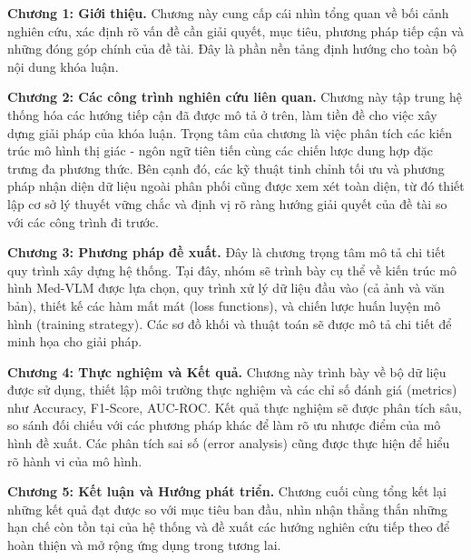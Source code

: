 \textbf{Chương 1: Giới thiệu.} Chương này cung cấp cái nhìn tổng quan về bối cảnh nghiên cứu, xác định rõ vấn đề cần giải quyết, mục tiêu, phương pháp tiếp cận và những đóng góp chính của đề tài. Đây là phần nền tảng định hướng cho toàn bộ nội dung khóa luận.

\textbf{Chương 2: Các công trình nghiên cứu liên quan.} Chương này tập trung hệ thống hóa các hướng tiếp cận đã được mô tả ở trên, làm tiền đề cho việc xây dựng giải pháp của khóa luận. Trọng tâm của chương là việc phân tích các kiến trúc mô hình thị giác - ngôn ngữ tiên tiến cùng các chiến lược dung hợp đặc trưng đa phương thức. Bên cạnh đó, các kỹ thuật tinh chỉnh tối ưu và phương pháp nhận diện dữ liệu ngoài phân phối cũng được xem xét toàn diện, từ đó thiết lập cơ sở lý thuyết vững chắc và định vị rõ ràng hướng giải quyết của đề tài so với các công trình đi trước.

\textbf{Chương 3: Phương pháp đề xuất.} Đây là chương trọng tâm mô tả chi tiết quy trình xây dựng hệ thống. Tại đây, nhóm sẽ trình bày cụ thể về kiến trúc mô hình Med-VLM được lựa chọn, quy trình xử lý dữ liệu đầu vào (cả ảnh và văn bản), thiết kế các hàm mất mát (loss functions), và chiến lược huấn luyện mô hình (training strategy). Các sơ đồ khối và thuật toán sẽ được mô tả chi tiết để minh họa cho giải pháp.

\textbf{Chương 4: Thực nghiệm và Kết quả.} Chương này trình bày về bộ dữ liệu được sử dụng, thiết lập môi trường thực nghiệm và các chỉ số đánh giá (metrics) như Accuracy, F1-Score, AUC-ROC. Kết quả thực nghiệm sẽ được phân tích sâu, so sánh đối chiếu với các phương pháp khác để làm rõ ưu nhược điểm của mô hình đề xuất. Các phân tích sai số (error analysis) cũng được thực hiện để hiểu rõ hành vi của mô hình.

\textbf{Chương 5: Kết luận và Hướng phát triển.} Chương cuối cùng tổng kết lại những kết quả đạt được so với mục tiêu ban đầu, nhìn nhận thẳng thắn những hạn chế còn tồn tại của hệ thống và đề xuất các hướng nghiên cứu tiếp theo để hoàn thiện và mở rộng ứng dụng trong tương lai.